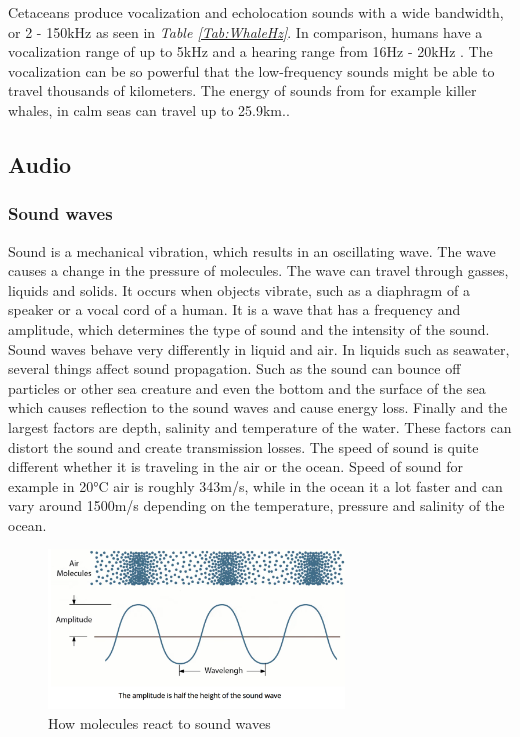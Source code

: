 Cetaceans produce vocalization and echolocation sounds with a wide bandwidth, or 2 - 150kHz as seen in \textit{Table \ref{Tab:WhaleHz}}.
In comparison, humans have a vocalization range of up to 5kHz and a hearing range from 16Hz - 20kHz \cite{monson_perceptual_2014}.
The vocalization can be so powerful that the low-frequency sounds might be able to travel thousands of kilometers\cite{nowacek_studying_2016}.
The energy of sounds from for example killer whales, in calm seas can travel up to 25.9km.\cite{miller_diversity_2006}.



\subsection{Audio}

\subsubsection{Sound waves}

Sound is a mechanical vibration, which results in an oscillating wave.
The wave causes a change in the pressure of molecules.
The wave can travel through gasses, liquids and solids.
It occurs when objects vibrate, such as a diaphragm of a speaker or a vocal cord of a human.
It is a wave that has a frequency and amplitude, which determines the type of sound and the intensity of the sound.
Sound waves behave very differently in liquid and air.
In liquids such as seawater, several things affect sound propagation.
Such as the sound can bounce off particles or other sea creature and even the bottom and the surface of the sea which causes reflection to the sound waves and cause energy loss.
Finally and the largest factors are depth, salinity and temperature of the water.
These factors can distort the sound and create transmission losses\cite{noauthor_sonar_nodate}.
The speed of sound is quite different whether it is traveling in the air or the ocean.
Speed of sound for example in 20°C air is roughly 343m/s, while in the ocean it a lot faster and can vary around 1500m/s depending on the temperature, pressure and salinity of the ocean. 

\begin{figure}[h]
    \centering
    \includegraphics[width=0.70\textwidth]{graphics/soundwaves.png}
    \caption{How molecules react to sound waves \cite{noauthor_what_nodate}}
    \label{fig:SoundWaves}
\end{figure}

